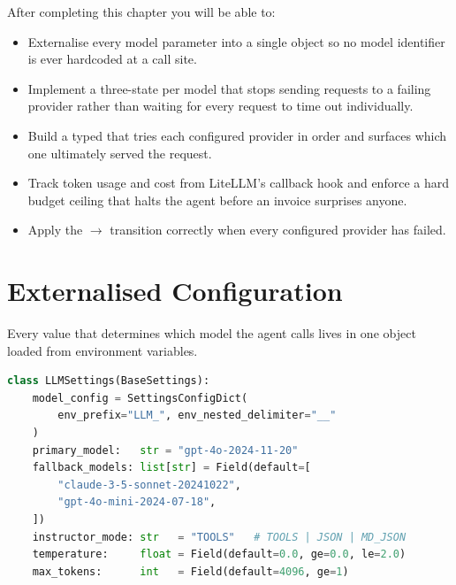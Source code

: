 

\begin{learningbox}
After completing this chapter you will be able to:
\begin{itemize}
  \item Externalise every model parameter into a single
         object so no model identifier is ever
        hardcoded at a call site.
  \item Implement a three-state  per model that
        stops sending requests to a failing provider rather than waiting
        for every request to time out individually.
  \item Build a typed  that tries each configured
        provider in order and surfaces which one ultimately served the
        request.
  \item Track token usage and cost from LiteLLM's callback hook and
        enforce a hard budget ceiling that halts the agent before an
        invoice surprises anyone.
  \item Apply the  $\to$  transition
        correctly when every configured provider has failed.
\end{itemize}
\end{learningbox}

\section{Externalised Configuration}
\label{sec:llm-settings}

Every value that determines which model the agent calls lives in one
 object loaded from environment variables.

\begin{lstlisting}[language=Python,
    caption={LLMSettings --- single source of model configuration
             (src/llm.py)},
    label={lst:llm-settings}]
class LLMSettings(BaseSettings):
    model_config = SettingsConfigDict(
        env_prefix="LLM_", env_nested_delimiter="__"
    )
    primary_model:   str = "gpt-4o-2024-11-20"
    fallback_models: list[str] = Field(default=[
        "claude-3-5-sonnet-20241022",
        "gpt-4o-mini-2024-07-18",
    ])
    instructor_mode: str   = "TOOLS"   # TOOLS | JSON | MD_JSON
    temperature:     float = Field(default=0.0, ge=0.0, le=2.0)
    max_tokens:      int   = Field(default=4096, ge=1)
\end{lstlisting}


